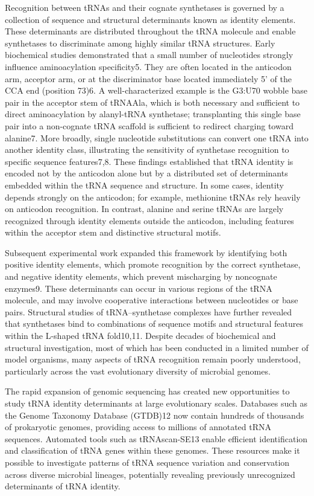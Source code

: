 \documentclass{article}
\begin{document}
Recognition between tRNAs and their cognate synthetases is governed by a collection of sequence and structural determinants known as identity elements. These determinants are distributed throughout the tRNA molecule and enable synthetases to discriminate among highly similar tRNA structures. Early biochemical studies demonstrated that a small number of nucleotides strongly influence aminoacylation specificity5. They are often located in the anticodon arm, acceptor arm, or at the discriminator base located immediately 5' of the CCA end (position 73)6.  A well-characterized example is the G3:U70 wobble base pair in the acceptor stem of tRNAAla, which is both necessary and sufficient to direct aminoacylation by alanyl-tRNA synthetase; transplanting this single base pair into a non-cognate tRNA scaffold is sufficient to redirect charging toward alanine7. More broadly, single nucleotide substitutions can convert one tRNA into another identity class, illustrating the sensitivity of synthetase recognition to specific sequence features7,8. These findings established that tRNA identity is encoded not by the anticodon alone but by a distributed set of determinants embedded within the tRNA sequence and structure. In some cases, identity depends strongly on the anticodon; for example, methionine tRNAs rely heavily on anticodon recognition. In contrast, alanine and serine tRNAs are largely recognized through identity elements outside the anticodon, including features within the acceptor stem and distinctive structural motifs.

Subsequent experimental work expanded this framework by identifying both positive identity elements, which promote recognition by the correct synthetase, and negative identity elements, which prevent mischarging by noncognate enzymes9. These determinants can occur in various regions of the tRNA molecule, and may involve cooperative interactions between nucleotides or base pairs. Structural studies of tRNA–synthetase complexes have further revealed that synthetases bind to combinations of sequence motifs and structural features within the L-shaped tRNA fold10,11. Despite decades of biochemical and structural investigation, most of which has been conducted in a limited number of model organisms, many aspects of tRNA recognition remain poorly understood, particularly across the vast evolutionary diversity of microbial genomes.

The rapid expansion of genomic sequencing has created new opportunities to study tRNA identity determinants at large evolutionary scales. Databases such as the Genome Taxonomy Database (GTDB)12 now contain hundreds of thousands of prokaryotic genomes, providing access to millions of annotated tRNA sequences. Automated tools such as tRNAscan-SE13 enable efficient identification and classification of tRNA genes within these genomes. These resources make it possible to investigate patterns of tRNA sequence variation and conservation across diverse microbial lineages, potentially revealing previously unrecognized determinants of tRNA identity.
\end{document}
